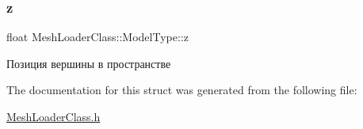 \mbox{\label{struct_mesh_loader_class_1_1_model_type_ad09ef47c7dd94e90c7d74c7a0fed4c74}} 
\subsubsection{\texorpdfstring{z}{z}}
{\footnotesize\ttfamily float Mesh\+Loader\+Class\+::\+Model\+Type\+::z}



Позиция вершины в пространстве 



The documentation for this struct was generated from the following file\+:\begin{DoxyCompactItemize}
\item 
\hyperlink{_mesh_loader_class_8h}{Mesh\+Loader\+Class.\+h}\end{DoxyCompactItemize}
